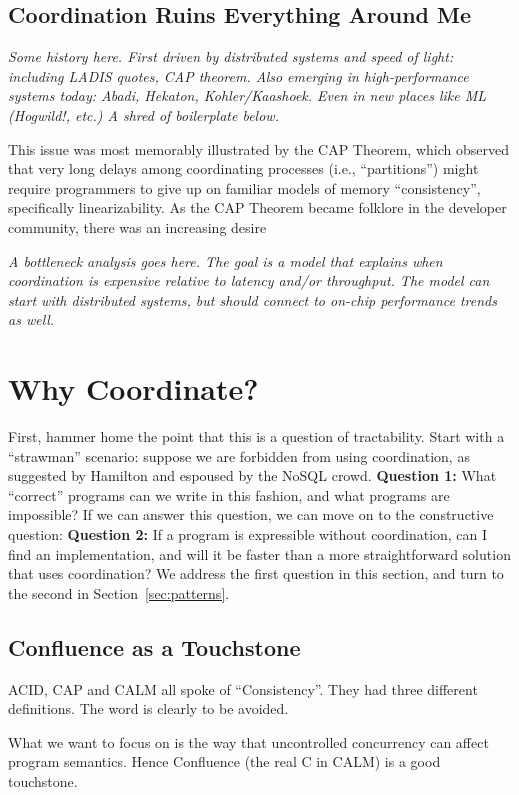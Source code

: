 \documentclass{sig-alternate}
\begin{document}
\subsection{Coordination Ruins Everything Around Me}
\emph{Some history here.  First driven by distributed systems and speed of light: including LADIS quotes, CAP theorem.  Also emerging in high-performance systems today: Abadi, Hekaton, Kohler/Kaashoek.  Even in new places like ML (Hogwild!, etc.)  A shred of boilerplate below.}

This issue was most memorably illustrated by the CAP Theorem, which observed that very long delays among coordinating processes (i.e., ``partitions'') might require programmers to give up on familiar models of memory ``consistency'', specifically linearizability.  As the CAP Theorem became folklore in the developer community, there was an increasing desire 


\emph{A bottleneck analysis goes here.  The goal is a model that explains when coordination is expensive relative to latency and/or throughput. The model can start with distributed systems, but should connect to on-chip performance trends as well.}

\section{Why Coordinate?}
First, hammer home the point that this is a question of tractability.  Start with a ``strawman'' scenario: suppose we are forbidden from using coordination, as suggested by Hamilton and espoused by the NoSQL crowd.  \textbf{Question 1:} What ``correct'' programs can we write in this fashion, and what programs are impossible?  If we can answer this question, we can move on to the constructive question:  \textbf{Question 2:} If a program is expressible without coordination, can I find an implementation, and will it be faster than a more straightforward solution that uses coordination?  We address the first question in this section, and turn to the second in Section~\ref{sec:patterns}.

\subsection{Confluence as a Touchstone}
ACID, CAP and CALM all spoke of ``Consistency''.  They had three different definitions.  The word is clearly to be avoided.

What we want to focus on is the way that uncontrolled concurrency can affect program semantics.  Hence Confluence (the real C in CALM) is a good touchstone.
\end{document}
